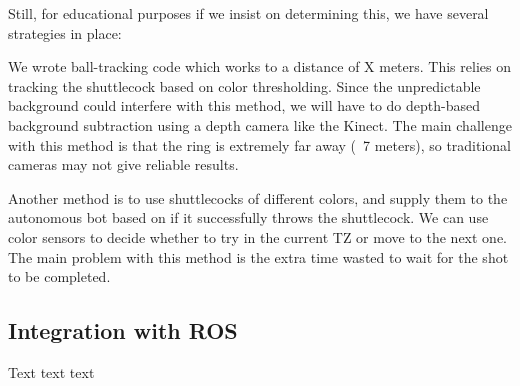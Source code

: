 \documentclass[11pt]{article}
\begin{document}
Still, for educational purposes if we insist on determining this, we have several strategies in place:

We wrote ball-tracking code which works to a distance of X meters. This relies on tracking the shuttlecock based on color thresholding. Since the unpredictable background could interfere with this method, we will have to do depth-based background subtraction using a depth camera like the Kinect. The main challenge with this method is that the ring is extremely far away (~7 meters), so traditional cameras may not give reliable results.

Another method is to use shuttlecocks of different colors, and supply them to the autonomous bot based on if it successfully throws the shuttlecock. We can use color sensors to decide whether to try in the current TZ or move to the next one. The main problem with this method is the extra time wasted to wait for the shot to be completed.

\subsection{Integration with ROS}
Text text text
\end{document}
